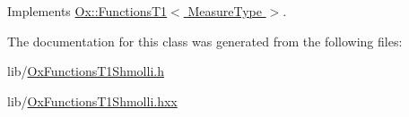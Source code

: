 Implements \hyperlink{class_ox_1_1_functions_t1_a2246ea540016c650d5a18100697eacb8}{Ox\-::\-Functions\-T1$<$ Measure\-Type $>$}.



The documentation for this class was generated from the following files\-:\begin{DoxyCompactItemize}
\item 
lib/\hyperlink{_ox_functions_t1_shmolli_8h}{Ox\-Functions\-T1\-Shmolli.\-h}\item 
lib/\hyperlink{_ox_functions_t1_shmolli_8hxx}{Ox\-Functions\-T1\-Shmolli.\-hxx}\end{DoxyCompactItemize}
